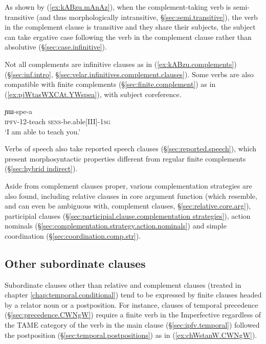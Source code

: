 As shown by (\ref{ex:kABzu.mAnAz}), when the complement-taking verb is semi-transitive (and thus morphologically intransitive, §\ref{sec:semi.transitive}), the verb in the complement clause is transitive and they share their subjects, the subject can take ergative case following the verb in the complement clause rather than absolutive (§\ref{sec:case.infinitive}).

Not all complements are infinitive clauses as in (\ref{ex:kABzu.complements}) (§\ref{sec:inf.intro}, §\ref{sec:velar.infinitives.complement.clauses}). Some verbs are also compatible with finite complements (§\ref{sec:finite.complement}) as in (\ref{ex:pjWtasWXCAt.YWspea}), with subject coreference.

\begin{exe} 
\ex \label{ex:pjWtasWXCAt.YWspea}
 ɲɯ-spe-a  \\
\textsc{ipfv}-1\fl{}2-teach \textsc{sens}-be.able[III]-\textsc{1sg} \\
\glt `I am able to teach you.' 
\end{exe} 

Verbs of speech also take reported speech clauses (§\ref{sec:reported.speech}), which present morphosyntactic properties different from  regular finite complements (§\ref{sec:hybrid indirect}).

Aside from complement clauses proper, various complementation strategies are also found, including relative clauses in core argument function (which resemble, and can even be ambiguous with, complement clauses, §\ref{sec:relative.core.arg}), participial clauses (§\ref{sec:participial.clause.complementation strategies}), action nominals (§\ref{sec:complementation.strategy.action.nominals}) and simple coordination (§\ref{sec:coordination.comp.str}).

\subsection{Other subordinate clauses}
Subordinate clauses other than relative and complement clauses (treated in chapter \ref{chap:temporal.conditional}) tend to be expressed by finite clauses headed by a relator noun or a postposition. For instance, clauses of temporal precedence (§\ref{sec:precedence.CWNgW}) require a finite verb in the Imperfective regardless of the TAME category of the verb in the main clause (§\ref{sec:ipfv.temporal}) followed the postposition  (§\ref{sec:temporal.postpositions}) as in (\ref{ex:chWstanW.CWNgW}).


